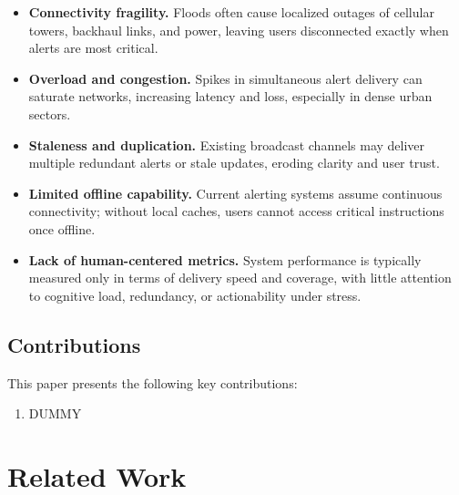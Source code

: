 \documentclass[11pt,twocolumn]{article}
\begin{document}
\begin{itemize}
    \item \textbf{Connectivity fragility.} Floods often cause localized outages of cellular towers, backhaul links, and power, leaving users disconnected exactly when alerts are most critical.
    \item \textbf{Overload and congestion.} Spikes in simultaneous alert delivery can saturate networks, increasing latency and loss, especially in dense urban sectors.
    \item \textbf{Staleness and duplication.} Existing broadcast channels may deliver multiple redundant alerts or stale updates, eroding clarity and user trust.
    \item \textbf{Limited offline capability.} Current alerting systems assume continuous connectivity; without local caches, users cannot access critical instructions once offline.
    \item \textbf{Lack of human-centered metrics.} System performance is typically measured only in terms of delivery speed and coverage, with little attention to cognitive load, redundancy, or actionability under stress.
\end{itemize}


\subsection{Contributions}
This paper presents the following key contributions:
\begin{enumerate}
\item DUMMY
\end{enumerate}

\section{Related Work}
\end{document}
